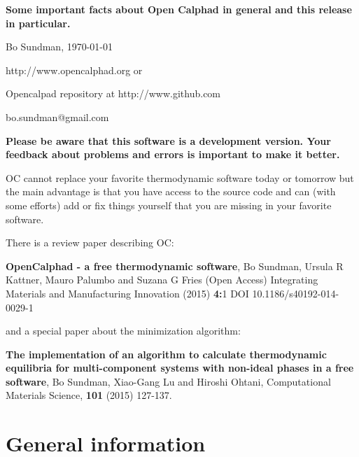 \documentclass[12pt]{article}
\begin{document}
\begin{center}
{\Large \bf Some important facts about Open Calphad in general and
  this release in particular.

}

Bo Sundman, \today

http://www.opencalphad.org or

Opencalpad repository at http://www.github.com

bo.sundman@gmail.com
\end{center}

{\large \bf Please be aware that this software is a development
  version.  Your feedback about problems and errors is important to
  make it better.

}

OC cannot replace your favorite thermodynamic software today or
tomorrow but the main advantage is that you have access to the source
code and can (with some efforts) add or fix things yourself that you
are missing in your favorite software.

There is a review paper describing OC:

{\bf OpenCalphad - a free thermodynamic software}, Bo Sundman, Ursula
R Kattner, Mauro Palumbo and Suzana G Fries (Open Access) Integrating
Materials and Manufacturing Innovation (2015) {\bf 4:}1 DOI
10.1186/s40192-014-0029-1

and a special paper about the minimization algorithm:

{\bf The implementation of an algorithm to calculate thermodynamic
  equilibria for multi-component systems with non-ideal phases in a
  free software}, Bo Sundman, Xiao-Gang Lu and Hiroshi Ohtani,
Computational Materials Science, {\bf 101} (2015) 127-137.

\section{General information}
\end{document}
